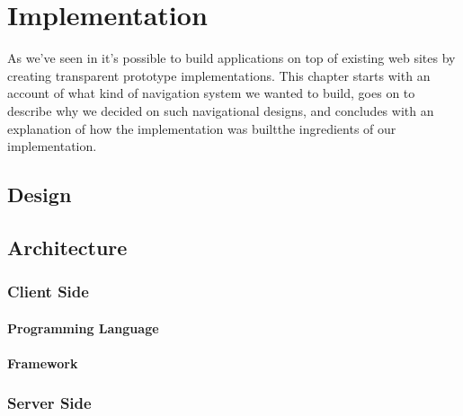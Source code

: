 \chapter{Implementation}
\label{chapter:implementation}


As we've seen in 
it's possible to build applications on top of existing web sites by creating
transparent prototype implementations. This chapter starts with an account of
what kind of navigation system we wanted to build, goes on to describe why we
decided on such navigational designs, and concludes with an explanation of how
the implementation was built\dash{}the ingredients of our implementation.

\section{Design}

\section{Architecture}

\subsection{Client Side}

\subsubsection{Programming Language}

\subsubsection{Framework}

\subsection{Server Side}

